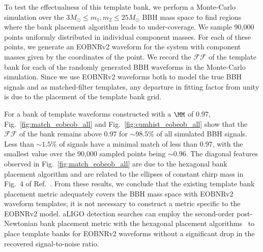 To test the effectualness of this template bank, we perform a Monte-Carlo
simulation over the $3 M_\odot \le m_1, m_2 \le 25 M_\odot$ BBH mass space to
find regions where the bank placement algorithm leads to under-coverage.  We
sample 90,000 points uniformly distributed in individual component masses. For
each of these points, we generate an EOBNRv2 waveform for the system with
component masses given by the coordinates of the point.  We record the $\mathcal{FF}$ of the template
bank for each of the randomly generated BBH waveforms in the Monte-Carlo
simulation.  Since we use EOBNRv2 waveforms both to model the true BBH signals and
as matched-filter templates, any departure in fitting factor from unity is
due to the placement of the template bank grid. 

For a bank of template waveforms constructed with a $\MM$ of $0.97$,
Fig.~\ref{fig:match_eobeob_all} and Fig.~\ref{fig:cumhist_eobeob_all} show
that the $\mathcal{FF}$ of the bank remains above $0.97$ for $\sim 98.5\%$ of
all simulated BBH signals. Less than $\sim 1.5\%$ of signals have a minimal
match of less than 0.97, with the smallest value over the 90,000 sampled
points being $\sim 0.96$.  The diagonal features observed in
Fig.~\ref{fig:match_eobeob_all} are due to the hexagonal bank placement
algorithm and are related to the ellipses of constant chirp mass in Fig.~4  of
Ref.~\citep{BabaketalBankPlacement}.  From these results, we conclude that the
existing template bank placement metric adequately covers the BBH mass space
with EOBNRv2 waveform templates; it is not necessary to construct a metric
specific to the EOBNRv2 model. aLIGO detection searches can employ the
second-order post-Newtonian bank placement metric with the hexagonal placement 
algorithms~\citep{SathyaMetric2PN,SathyaBankPlacementTauN,BabaketalBankPlacement,OwenTemplateSpacing,Cokelaer:2007kx}
to place template banks for EOBNRv2
waveforms without a significant drop in the recovered signal-to-noise ratio.

